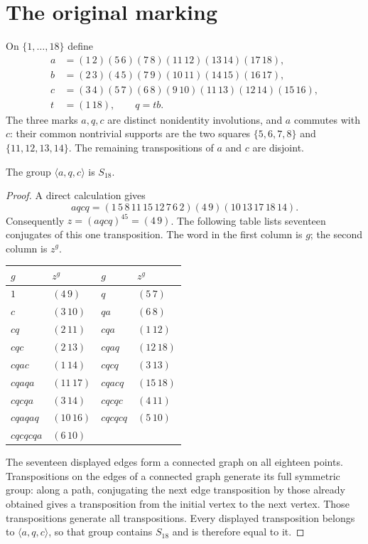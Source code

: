 \documentclass[a4paper,11pt]{article}
\newcommand{\gen}[1]{\langle#1\rangle}
\begin{document}
\section{The original marking}
On $\{1,\ldots,18\}$ define
\begin{align*}
 a&=(1\,2)(5\,6)(7\,8)(11\,12)(13\,14)(17\,18),\\
 b&=(2\,3)(4\,5)(7\,9)(10\,11)(14\,15)(16\,17),\\
 c&=(3\,4)(5\,7)(6\,8)(9\,10)(11\,13)(12\,14)(15\,16),\\
 t&=(1\,18),\qquad q=tb.
\end{align*}
The three marks $a,q,c$ are distinct nonidentity involutions, and $a$
commutes with $c$: their common nontrivial supports are the two squares
$\{5,6,7,8\}$ and $\{11,12,13,14\}$. The remaining transpositions of
$a$ and $c$ are disjoint.

\begin{lemma}\label{generation}
The group $\gen{a,q,c}$ is $S_{18}$.
\end{lemma}
\begin{proof}
A direct calculation gives
\[
 aqcq=(1\,5\,8\,11\,15\,12\,7\,6\,2)(4\,9)
       (10\,13\,17\,18\,14).
\]
Consequently $z=(aqcq)^{45}=(4\,9)$. The following table lists seventeen
conjugates of this one transposition. The word in the first column is $g$;
the second column is $z^g$.
\begin{center}
\begin{tabular}{ll@{\qquad}ll}
\toprule
$g$&$z^g$&$g$&$z^g$\\\midrule
$1$&$(4\,9)$&$q$&$(5\,7)$\\
$c$&$(3\,10)$&$qa$&$(6\,8)$\\
$cq$&$(2\,11)$&$cqa$&$(1\,12)$\\
$cqc$&$(2\,13)$&$cqaq$&$(12\,18)$\\
$cqac$&$(1\,14)$&$cqcq$&$(3\,13)$\\
$cqaqa$&$(11\,17)$&$cqacq$&$(15\,18)$\\
$cqcqa$&$(3\,14)$&$cqcqc$&$(4\,11)$\\
$cqaqaq$&$(10\,16)$&$cqcqcq$&$(5\,10)$\\
$cqcqcqa$&$(6\,10)$&&\\\bottomrule
\end{tabular}
\end{center}
The seventeen displayed edges form a connected graph on all eighteen
points. Transpositions on the edges of a connected graph generate its
full symmetric group: along a path, conjugating the next edge
transposition by those already obtained gives a transposition from the
initial vertex to the next vertex. Those transpositions generate all
transpositions. Every displayed transposition belongs to $\gen{a,q,c}$,
so that group contains $S_{18}$ and is therefore equal to it.
\end{proof}
\end{document}
